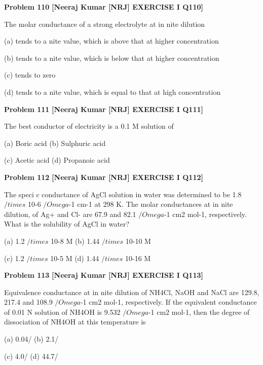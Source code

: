\begin{problembox}
\textbf{Problem 110} \hfill \textbf{[Neeraj Kumar [NRJ] EXERCISE I Q110]}
\label{q:ext-nrj_all_questions-110}

The molar conductance of a strong electrolyte at 
in  nite dilution
 
 (a)  tends to a   nite value, which is above that at 
higher concentration
 
 (b)  tends to a   nite value, which is below that at 
higher concentration
 
 (c) tends to zero
 
 (d)  tends to a   nite value, which is equal to that at 
high concentration
\end{problembox}

\begin{problembox}
\textbf{Problem 111} \hfill \textbf{[Neeraj Kumar [NRJ] EXERCISE I Q111]}
\label{q:ext-nrj_all_questions-111}

The best conductor of electricity is a 0.1  M 
solution of
 
 (a) Boric acid 
(b) Sulphuric acid
 
 (c) Acetic acid 
(d) Propanoic acid
\end{problembox}

\begin{problembox}
\textbf{Problem 112} \hfill \textbf{[Neeraj Kumar [NRJ] EXERCISE I Q112]}
\label{q:ext-nrj_all_questions-112}

The speci  c conductance of AgCl solution in 
water was determined to be 1.8 $/times$ 10-6 $/Omega$-1 cm-1 
at 298 K. The molar conductances at in  nite 
dilution, of Ag+ and Cl- are 67.9 and 82.1 $/Omega$-1 cm2 
mol-1, respectively. What is the solubility of AgCl 
in water?
 
 (a) 1.2 $/times$ 10-8 M 
(b) 1.44 $/times$ 10-10 M
 
 (c) 1.2 $/times$ 10-5 M 
(d) 1.44 $/times$ 10-16 M
\end{problembox}

\begin{problembox}
\textbf{Problem 113} \hfill \textbf{[Neeraj Kumar [NRJ] EXERCISE I Q113]}
\label{q:ext-nrj_all_questions-113}

Equivalence conductance at in  nite dilution 
of NH4Cl, NaOH and NaCl are 129.8, 217.4 
and 108.9 $/Omega$-1 cm2 mol-1, respectively. If the 
equivalent conductance of 0.01 N solution of 
NH4OH is 9.532 $/Omega$-1 cm2 mol-1, then the degree 
of dissociation of NH4OH at this temperature is
 
 (a) 0.04/%
(b) 2.1/%
 
 (c) 4.0/%
(d) 44.7/%
\end{problembox}

